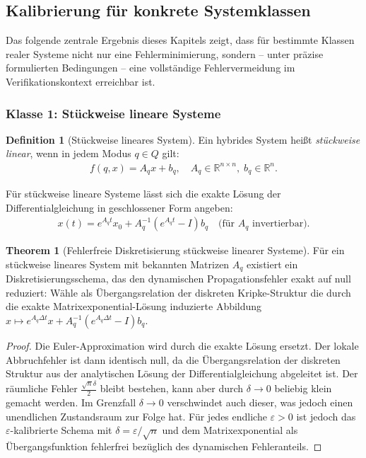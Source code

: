 ﻿\documentclass[a4paper,12pt]{article}
\theoremstyle{definition}
\newtheorem{definition}{Definition}[section]
\newtheorem{theorem}{Theorem}[section]
\begin{document}
\subsection{Kalibrierung für konkrete Systemklassen}

Das folgende zentrale Ergebnis dieses Kapitels zeigt, dass für bestimmte Klassen realer Systeme nicht nur eine Fehlerminimierung, sondern -- unter präzise formulierten Bedingungen -- eine vollständige Fehlervermeidung im Verifikationskontext erreichbar ist.

\subsubsection{Klasse 1: Stückweise lineare Systeme}

\begin{definition}[Stückweise lineares System]
Ein hybrides System heißt \emph{stückweise linear}, wenn in jedem Modus $q \in Q$ gilt:
\begin{align}
  f(q, x) = A_q x + b_q, \quad A_q \in \mathbb{R}^{n \times n},\; b_q \in \mathbb{R}^n.
\end{align}
\end{definition}

Für stückweise lineare Systeme lässt sich die exakte Lösung der Differentialgleichung in geschlossener Form angeben:
\begin{align}
  x(t) = e^{A_q t} x_0 + A_q^{-1}(e^{A_q t} - I) b_q \quad \text{(für } A_q \text{ invertierbar)}.
\end{align}

\begin{theorem}[Fehlerfreie Diskretisierung stückweise linearer Systeme]
\label{thm:fehlerfrei_linear}
Für ein stückweise lineares System mit bekannten Matrizen $A_q$ existiert ein Diskretisierungsschema, das den dynamischen Propagationsfehler exakt auf null reduziert: Wähle als Übergangsrelation der diskreten Kripke-Struktur die durch die exakte Matrixexponential-Lösung induzierte Abbildung $x \mapsto e^{A_q \Delta t} x + A_q^{-1}(e^{A_q \Delta t} - I) b_q$.
\end{theorem}

\begin{proof}
Die Euler-Approximation wird durch die exakte Lösung ersetzt. Der lokale Abbruchfehler ist dann identisch null, da die Übergangsrelation der diskreten Struktur aus der analytischen Lösung der Differentialgleichung abgeleitet ist. Der räumliche Fehler $\frac{\sqrt{n}\delta}{2}$ bleibt bestehen, kann aber durch $\delta \to 0$ beliebig klein gemacht werden. Im Grenzfall $\delta \to 0$ verschwindet auch dieser, was jedoch einen unendlichen Zustandsraum zur Folge hat. Für jedes endliche $\varepsilon > 0$ ist jedoch das $\varepsilon$-kalibrierte Schema mit $\delta = \varepsilon/\sqrt{n}$ und dem Matrixexponential als Übergangsfunktion fehlerfrei bezüglich des dynamischen Fehleranteils.
\end{proof}
\end{document}
